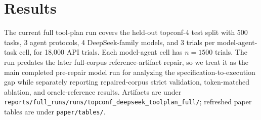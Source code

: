\section{Results}
The current full tool-plan run covers the held-out topconf-4 test split with 500 tasks, 3 agent protocols, 4 DeepSeek-family models, and 3 trials per model-agent-task cell, for 18,000 API trials. Each model-agent cell has \(n=1500\) trials. The run predates the later full-corpus reference-artifact repair, so we treat it as the main completed pre-repair model run for analyzing the specification-to-execution gap while separately reporting repaired-corpus strict validation, token-matched ablation, and oracle-reference results. Artifacts are under \texttt{reports/full\_runs/runs/topconf\_deepseek\_toolplan\_full/}; refreshed paper tables are under \texttt{paper/tables/}.

\begin{table}[tbp]
\centering
\small
{}
\caption{Full DeepSeek tool-plan results. Values are percentages; bootstrap confidence intervals are in \texttt{paper/tables/main\_results\_full\_toolplan.csv}.}
\end{table}

